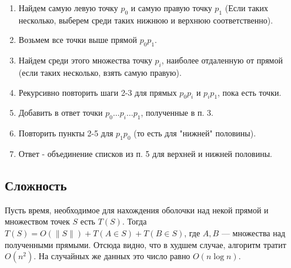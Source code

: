 \begin{enumerate}
	\item Найдем самую левую точку $p_0$ и самую правую точку $p_1$ (Если таких несколько, выберем среди таких нижнюю и верхнюю соответственно).
	\item Возьмем все точки выше прямой $p_0 p_1$.
	\item Найдем среди этого множества точку $p_i$, наиболее отдаленную от прямой (если таких несколько, взять самую правую).
	\item Рекурсивно повторить шаги 2-3 для прямых $p_0 p_i$ и $p_i p_1$, пока есть точки.
	\item Добавить в ответ точки $p_0 \dots p_i \dots p_1$, полученные в п. 3.
	\item Повторить пункты 2-5 для $p_1 p_0$ (то есть для "нижней" половины).
	\item Ответ - объединение списков из п. 5 для верхней и нижней половины.
\end{enumerate}

\subsection*{Сложность}

Пусть время, необходимое для нахождения оболочки над некой прямой и множеством точек $S$ есть $T(S)$. Тогда
$T(S) = O(\|S\|) + T(A \in S) + T(B \in S)$, где $A, B$ --- множества над полученными прямыми. Отсюда видно, что в худшем случае, алгоритм тратит $O(n^2)$. На случайных же данных это число равно $O(n \log n)$.

